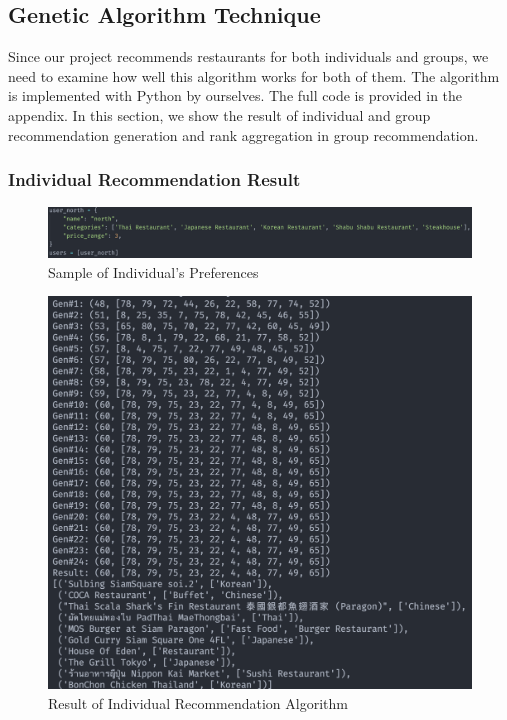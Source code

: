 \documentclass[12pt,oneside,openright,a4paper]{cpe-english-project}
\begin{document}
\subsection{Genetic Algorithm Technique}


Since our project recommends restaurants for both individuals and groups, we need to examine how well this algorithm works for both of them. The algorithm is implemented with Python by ourselves. The full code is provided in the appendix. In this section, we show the result of individual and group recommendation generation and rank aggregation in group recommendation.

\subsubsection{Individual Recommendation Result}


\begin{figure}[H]\centering
\includegraphics[width=350pt]{./images/4SampleofIndividualsPreferences.png}
\caption{Sample of Individual’s Preferences}\label{fig:4SampleofIndividualsPreferences}
\end{figure}

\begin{figure}[H]\centering
\includegraphics[width=350pt]{./images/4ResultofIndividualRecommendationAlgorithm.png}
\caption{Result of Individual Recommendation Algorithm}\label{fig:4ResultofIndividualRecommendationAlgorithm}
\end{figure}
\end{document}
